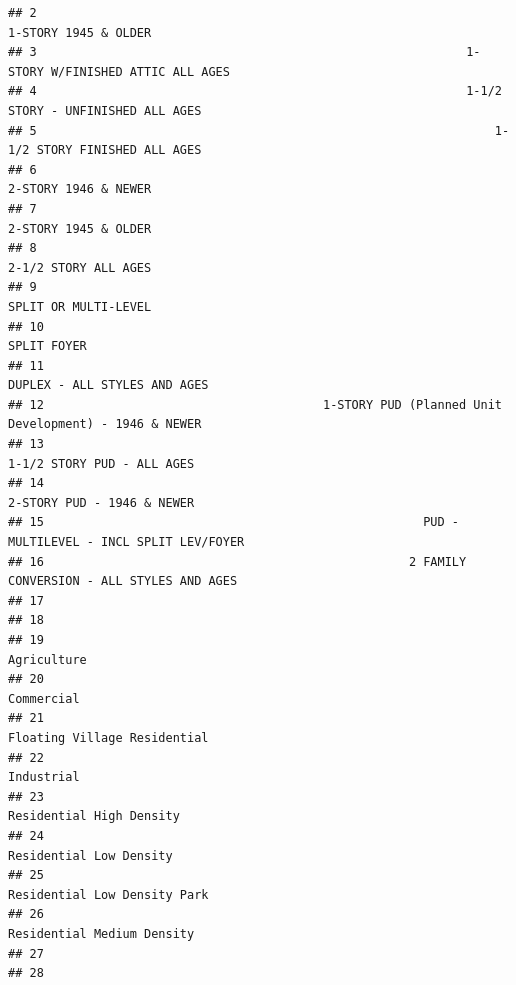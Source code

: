 \documentclass[
]{article}
\begin{document}
\begin{verbatim}
## 2                                                                         1-STORY 1945 & OLDER
## 3                                                            1-STORY W/FINISHED ATTIC ALL AGES
## 4                                                            1-1/2 STORY - UNFINISHED ALL AGES
## 5                                                                1-1/2 STORY FINISHED ALL AGES
## 6                                                                         2-STORY 1946 & NEWER
## 7                                                                         2-STORY 1945 & OLDER
## 8                                                                         2-1/2 STORY ALL AGES
## 9                                                                         SPLIT OR MULTI-LEVEL
## 10                                                                                 SPLIT FOYER
## 11                                                                DUPLEX - ALL STYLES AND AGES
## 12                                       1-STORY PUD (Planned Unit Development) - 1946 & NEWER
## 13                                                                  1-1/2 STORY PUD - ALL AGES
## 14                                                                  2-STORY PUD - 1946 & NEWER
## 15                                                     PUD - MULTILEVEL - INCL SPLIT LEV/FOYER
## 16                                                   2 FAMILY CONVERSION - ALL STYLES AND AGES
## 17                                                                                            
## 18                                                                                            
## 19                                                                                 Agriculture
## 20                                                                                  Commercial
## 21                                                                Floating Village Residential
## 22                                                                                  Industrial
## 23                                                                    Residential High Density
## 24                                                                     Residential Low Density
## 25                                                               Residential Low Density Park 
## 26                                                                  Residential Medium Density
## 27                                                                                            
## 28                                                                                            

\end{verbatim}
\end{document}

